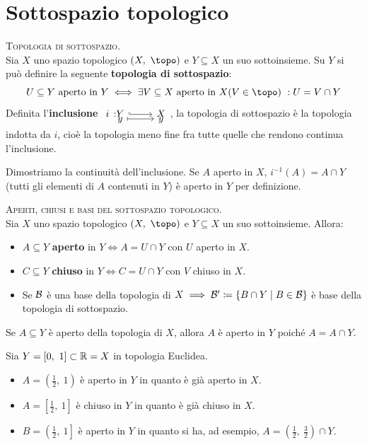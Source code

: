 \section{Sottospazio topologico} \label{sottospazi}
\begin{define}\textsc{Topologia di sottospazio.}\\
Sia $X$ uno spazio topologico $\left(X,\ \topo\right)$ e $Y\subseteq X$ un suo sottoinsieme. Su $Y$ si può definire la seguente \textbf{topologia di sottospazio}:
\begin{equation}
U\subseteq Y\text{ aperto in } Y \iff \exists V\subseteq X\text{ aperto in } X (V\in \topo)\ : U=V\cap Y
\end{equation}
Definita l'\textbf{inclusione} $\incltot{i}{Y}{X}{y}{y}$, la topologia di sottospazio è la topologia indotta da $i$, cioè la topologia meno fine fra tutte quelle che rendono continua l'inclusione.
\end{define}
\begin{demonstration}
Dimostriamo la continuità dell'inclusione. Se $A$ aperto in $X$, $i^{-1}\left(A\right)=A\cap Y$ (tutti gli elementi di $A$ contenuti in $Y$) è aperto in $Y$ per definizione.
\end{demonstration}
\begin{define}\textsc{Aperti, chiusi e basi del sottospazio topologico.}\\
	Sia $X$ uno spazio topologico $\left(X,\ \topo\right)$ e $Y\subseteq X$ un suo sottoinsieme. Allora:
	\begin{itemize}
		\item $A\subseteq Y$ \textbf{aperto} in $Y\iff A=U\cap Y$ con $U$ aperto in $X$.
		\item $C\subseteq Y$ \textbf{chiuso} in $Y\iff C=U\cap Y$ con $V$ chiuso in $X$.
		\item Se $\mathcal{B}$ è una base della topologia di $X\implies \mathcal{B}'\coloneqq\left\{B\cap Y\mid B\in\mathcal{B}\right\}$ è base della topologia di sottospazio.
	\end{itemize}
\vspace{-3mm}
\end{define}
\begin{observe}
	Se $A\subseteq Y$ è aperto della topologia di $X$, allora $A$ è aperto in $Y$ poiché $A=A\cap Y$.
\end{observe}
\begin{examples} Sia $Y=\left[0,\ 1\right]\subset\realset=X$ in topologia Euclidea.
	\begin{itemize}
		\item $A=\left(\frac{1}{2},\ 1\right)$ è aperto in $Y$ in quanto è già aperto in $X$.
		\item $A=\left[\frac{1}{2},\ 1\right]$ è chiuso in $Y$ in quanto è già chiuso in $X$.
		\item $B=\left(\frac{1}{2},\ 1\right]$ è aperto in $Y$ in quanto si ha, ad esempio, $A=\left(\frac{1}{2},\ \frac{3}{2}\right)\cap Y$.
	\end{itemize}
\vspace{-3mm}
\end{examples}
